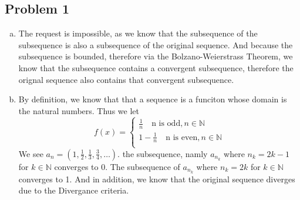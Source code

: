 \documentclass[12pt]{article}
\begin{document}
\subsection*{Problem 1}
\begin{enumerate}[a).]
    \item {
    The request is impossible, as we know that the subsequence of the subsequence is also a subsequence of the original sequence. 
    And because the subsequence is bounded, therefore via the Bolzano-Weierstrass Theorem, we know that the subsequence contains a convergent subsequence, therefore the orignal sequence also contains that convergent subsequence.
    }
    \item {
    By definition, we know that that a sequence is a funciton whose domain is the natural numbers.
    Thus we let 
        $$ 
        f(x) = \left\{ 
            \begin{array}{ll} 
                \frac{1}{n} \quad \text{n is odd}, n \in \mathbb{N}\\
                1 - \frac{1}{n} \quad \text{n is even}, n \in \mathbb{N} \\
            \end{array} \right.
        $$
    We see $a_n = (1,\frac{1}{2},\frac{1}{3}, \frac{3}{4}, \dots)$.
    the subsequence, namly $a_{n_k}$ where $n_k = 2k - 1$ for $k \in \mathbb{N}$ converges to 0.
    The subsequence of $a_{n_k}$ where $n_k = 2k $ for $k \in \mathbb{N}$ converges to 1. 
    And in addition, we know that the original sequence diverges due to the Divergance criteria. 
    }
\end{enumerate}
\end{document}

